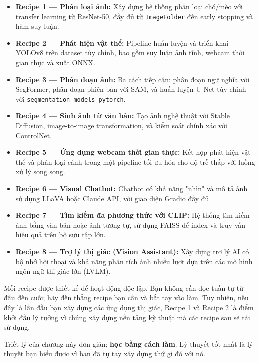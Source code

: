 \begin{itemize}
    \item \textbf{Recipe 1 --- Phân loại ảnh:} Xây dựng hệ thống phân loại chó/mèo với transfer learning từ ResNet-50, đầy đủ từ \texttt{ImageFolder} đến early stopping và hàm suy luận.

    \item \textbf{Recipe 2 --- Phát hiện vật thể:} Pipeline huấn luyện và triển khai YOLOv8 trên dataset tùy chỉnh, bao gồm suy luận ảnh tĩnh, webcam thời gian thực và xuất ONNX.

    \item \textbf{Recipe 3 --- Phân đoạn ảnh:} Ba cách tiếp cận: phân đoạn ngữ nghĩa với SegFormer, phân đoạn phiên bản với SAM, và huấn luyện U-Net tùy chỉnh với \texttt{segmentation-models-pytorch}.

    \item \textbf{Recipe 4 --- Sinh ảnh từ văn bản:} Tạo ảnh nghệ thuật với Stable Diffusion, image-to-image transformation, và kiểm soát chính xác với ControlNet.

    \item \textbf{Recipe 5 --- Ứng dụng webcam thời gian thực:} Kết hợp phát hiện vật thể và phân loại cảnh trong một pipeline tối ưu hóa cho độ trễ thấp với luồng xử lý song song.

    \item \textbf{Recipe 6 --- Visual Chatbot:} Chatbot có khả năng "nhìn" và mô tả ảnh sử dụng LLaVA hoặc Claude API, với giao diện Gradio đầy đủ.

    \item \textbf{Recipe 7 --- Tìm kiếm đa phương thức với CLIP:} Hệ thống tìm kiếm ảnh bằng văn bản hoặc ảnh tương tự, sử dụng FAISS để index và truy vấn hiệu quả trên bộ sưu tập lớn.

    \item \textbf{Recipe 8 --- Trợ lý thị giác (Vision Assistant):} Xây dựng trợ lý AI có bộ nhớ hội thoại và khả năng phân tích ảnh nhiều lượt dựa trên các mô hình ngôn ngữ-thị giác lớn (LVLM).
\end{itemize}

Mỗi recipe được thiết kế để hoạt động độc lập. Bạn không cần đọc tuần tự từ đầu đến cuối; hãy đến thẳng recipe bạn cần và bắt tay vào làm. Tuy nhiên, nếu đây là lần đầu bạn xây dựng các ứng dụng thị giác, Recipe 1 và Recipe 2 là điểm khởi đầu lý tưởng vì chúng xây dựng nền tảng kỹ thuật mà các recipe sau sẽ tái sử dụng.

Triết lý của chương này đơn giản: \textbf{học bằng cách làm}. Lý thuyết tốt nhất là lý thuyết bạn hiểu được vì bạn đã tự tay xây dựng thứ gì đó với nó.
